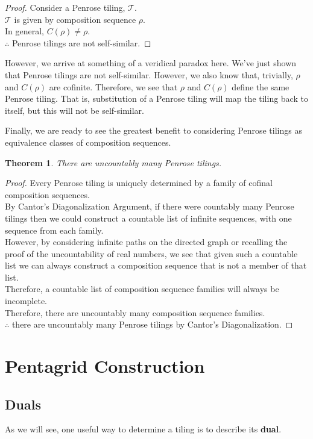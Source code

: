 \documentclass[
  oneside,
  11pt, a4paper,
  footinclude=true,
  headinclude=true,
  cleardoublepage=empty
]{scrbook}
\newtheorem{mythm}{Theorem}
\begin{document}
\begin{proof}
Consider a Penrose tiling, $\mathcal{T}$.\\
$\mathcal{T}$ is given by composition sequence $\rho$.\\
In general, $C(\rho)\neq\rho$.\\
$\therefore$ Penrose tilings are not self-similar.
\end{proof}

However, we arrive at something of a veridical paradox here. We've just shown that Penrose tilings are not self-similar. However, we also know that, trivially, $\rho$ and $C(\rho)$ are cofinite. Therefore, we see that $\rho$ and $C(\rho)$ define the same Penrose tiling. That is, substitution of a Penrose tiling will map the tiling back to itself, but this will not be self-similar. 

Finally, we are ready to see the greatest benefit to considering Penrose tilings as equivalence classes of composition sequences.

\begin{mythm}
There are uncountably many Penrose tilings.
\end{mythm}

\begin{proof}
Every Penrose tiling is uniquely determined by a family of cofinal composition sequences.\\
By Cantor's Diagonalization Argument, if there were countably many Penrose tilings then we could construct a countable list of infinite sequences, with one sequence from each family.\\
However, by considering infinite paths on the directed graph or recalling the proof of the uncountability of real numbers, we see that given such a countable list we can always construct a composition sequence that is not a member of that list.\\
Therefore, a countable list of composition sequence families will always be incomplete.\\
Therefore, there are uncountably many composition sequence families.\\
$\therefore$ there are uncountably many Penrose tilings by Cantor's Diagonalization.
\end{proof}
\chapter{Pentagrid Construction}
\section{Duals}
As we will see, one useful way to determine a tiling is to describe its \textbf{dual}. \cite{Effinger2006}
\end{document}
